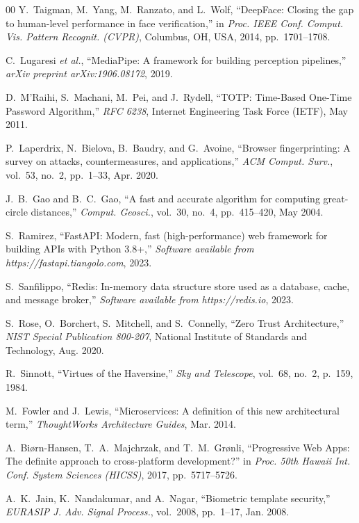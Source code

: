 \documentclass[conference]{IEEEtran}
\begin{document}
\begin{thebibliography}{00}
Y.~Taigman, M.~Yang, M.~Ranzato, and L.~Wolf, ``DeepFace: Closing the gap to human-level performance in face verification,'' in \textit{Proc. IEEE Conf. Comput. Vis. Pattern Recognit. (CVPR)}, Columbus, OH, USA, 2014, pp.~1701--1708.

C.~Lugaresi \textit{et al.}, ``MediaPipe: A framework for building perception pipelines,'' \textit{arXiv preprint arXiv:1906.08172}, 2019.

D.~M'Raihi, S.~Machani, M.~Pei, and J.~Rydell, ``TOTP: Time-Based One-Time Password Algorithm,'' \textit{RFC 6238}, Internet Engineering Task Force (IETF), May 2011.

P.~Laperdrix, N.~Bielova, B.~Baudry, and G.~Avoine, ``Browser fingerprinting: A survey on attacks, countermeasures, and applications,'' \textit{ACM Comput. Surv.}, vol.~53, no.~2, pp.~1--33, Apr. 2020.

J.~B.~Gao and B.~C.~Gao, ``A fast and accurate algorithm for computing great-circle distances,'' \textit{Comput. Geosci.}, vol.~30, no.~4, pp.~415--420, May 2004.

S.~Ramirez, ``FastAPI: Modern, fast (high-performance) web framework for building APIs with Python 3.8+,'' \textit{Software available from https://fastapi.tiangolo.com}, 2023.

S.~Sanfilippo, ``Redis: In-memory data structure store used as a database, cache, and message broker,'' \textit{Software available from https://redis.io}, 2023.

S.~Rose, O.~Borchert, S.~Mitchell, and S.~Connelly, ``Zero Trust Architecture,'' \textit{NIST Special Publication 800-207}, National Institute of Standards and Technology, Aug. 2020.

R.~Sinnott, ``Virtues of the Haversine,'' \textit{Sky and Telescope}, vol.~68, no.~2, p.~159, 1984.

M.~Fowler and J.~Lewis, ``Microservices: A definition of this new architectural term,'' \textit{ThoughtWorks Architecture Guides}, Mar. 2014.

A.~Bi{\o}rn-Hansen, T.~A.~Majchrzak, and T.~M.~Gr{\o}nli, ``Progressive Web Apps: The definite approach to cross-platform development?'' in \textit{Proc. 50th Hawaii Int. Conf. System Sciences (HICSS)}, 2017, pp.~5717--5726.

A.~K.~Jain, K.~Nandakumar, and A.~Nagar, ``Biometric template security,'' \textit{EURASIP J. Adv. Signal Process.}, vol.~2008, pp.~1--17, Jan. 2008.

\end{thebibliography}
\end{document}
